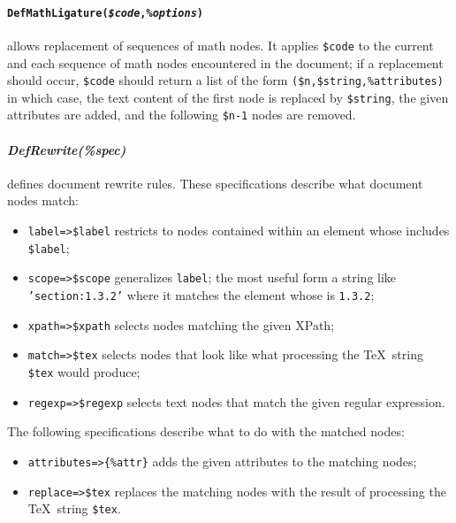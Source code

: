 \documentclass{book}
\newcommand{\ltxcode}{\lstinline[style=inlinelatexml]}
\begin{document}
\paragraph[DefMathLigature]{%
    \texttt{DefMathLigature(\textit{\$code},\textit{\%options})}}
allows replacement of sequences of math nodes.
It applies \ltxcode|$code| to the current 
and each sequence of math nodes encountered in the document; if a replacement should
occur, \ltxcode|$code| should return a list of the form \ltxcode|($n,$string,%
in which case, the text content of the first node is replaced by \ltxcode|$string|,
the given attributes are added, and the following \ltxcode|$n-1| nodes are removed.

\paragraph[DefRewrite]{%
  \textit{DefRewrite(\textit{\%spec})}}
defines document rewrite rules. These specifications describe what document nodes match:
\begin{itemize}
\item \ltxcode|label=>$label| restricts to nodes contained within an element whose
   includes \ltxcode|$label|;
\item \ltxcode|scope=>$scope| generalizes \texttt{label}; the most useful form
 a string like \texttt{'section:1.3.2'} where it matches the 
  element whose  is \texttt{1.3.2};
\item \ltxcode|xpath=>$xpath| selects nodes matching the given XPath;
\item \ltxcode|match=>$tex| selects nodes that look like what processing
 the \TeX\ string \ltxcode|$tex| would produce;
\item \ltxcode|regexp=>$regexp| selects text nodes that match the given regular expression.
\end{itemize}
The following specifications describe what to do with the matched nodes:
\begin{itemize}
\item \ltxcode|attributes=>{%
\item \ltxcode|replace=>$tex| replaces the matching nodes with the result
of processing the \TeX\ string \ltxcode|$tex|.
\end{itemize}
\end{document}
